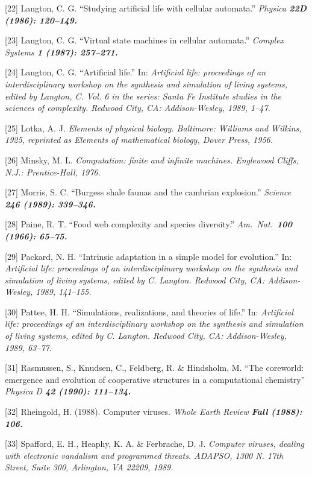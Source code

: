 [22] Langton, C. G.  ``Studying artificial life with cellular automata.''
\it Physica \bf 22D \rm (1986): 120--149.

[23] Langton, C. G.  ``Virtual state machines in cellular automata.''
\it Complex Systems \bf 1 \rm (1987): 257--271.

[24] Langton, C. G.  ``Artificial life.''  In: \it Artificial life: proceedings
of an interdisciplinary workshop on the synthesis and simulation of living
systems\rm , edited by Langton, C.  Vol. 6 in the series: Santa Fe Institute
studies in the sciences of complexity. Redwood City, CA: Addison-Wesley,
1989, 1--47.

[25] Lotka, A. J.  \it Elements of physical biology\rm .  Baltimore: Williams
and Wilkins, 1925, reprinted as \it Elements of mathematical biology\rm ,
Dover Press, 1956.

[26] Minsky, M. L.  \it Computation: finite and infinite machines\rm .
Englewood Cliffs, N.J.: Prentice-Hall, 1976.

[27] Morris, S. C.  ``Burgess shale faunas and the cambrian explosion.''
\it Science \bf 246 \rm (1989): 339--346.

[28] Paine, R. T.  ``Food web complexity and species diversity.''
\it Am.\ Nat.\ \bf 100 \rm (1966): 65--75.

[29] Packard, N. H.  ``Intrinsic adaptation in a simple model for
evolution.''  In: \it Artificial life: proceedings of an interdisciplinary
workshop on the synthesis and simulation of living systems\rm , edited by C.
Langton.  Redwood City, CA: Addison-Wesley, 1989, 141--155.

[30] Pattee, H. H.  ``Simulations, realizations, and theories of life.''
In: \it Artificial life: proceedings of an interdisciplinary workshop on
the synthesis and simulation of living systems\rm , edited by C. Langton.
Redwood City, CA: Addison-Wesley, 1989, 63--77.

[31] Rasmussen, S., Knudsen, C., Feldberg, R. \& Hindsholm, M.  ``The
coreworld: emergence and evolution of cooperative structures in a
computational chemistry''  \it Physica D \bf 42 \rm (1990): 111--134.

[32] Rheingold, H.  (1988).  Computer viruses.  \it Whole Earth Review \bf
Fall \rm (1988): 106.

[33] Spafford, E. H., Heaphy, K. A. \& Ferbrache, D. J.  \it Computer
viruses, dealing with electronic vandalism and programmed threats\rm .
ADAPSO, 1300 N. 17th Street, Suite 300, Arlington, VA 22209, 1989.

